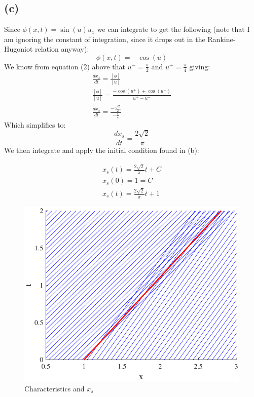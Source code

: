 \documentclass{article}
\begin{document}
\subsection*{(c)}
Since $\phi(x,t) = \sin(u)u_x$ we can integrate to get the following (note that I am ignoring the constant of integration, since it drops out in the Rankine-Hugoniot relation anyway):
\begin{equation}
\phi(x, t) = -\cos(u)
\end{equation}
We know from equation (2) above that $u^- = \frac{\pi}{2}$ and $u^+ = \frac{\pi}{4}$ giving:
\begin{equation}
\begin{aligned}
\frac{dx_s}{dt} = \frac{[\phi]}{[u]}\\
\frac{[\phi]}{[u]} = \frac{-\cos(u^+) + \cos(u^-)}{u^+ - u^-}\\
\frac{dx_s}{dt} = \frac{-\frac{\sqrt{2}}{2}}{-\frac{\pi}{4}}
\end{aligned}
\end{equation}
Which simplifies to:
\begin{equation}
\frac{dx_s}{dt} = \frac{2\sqrt{2}}{\pi}
\end{equation}
We then integrate and apply the initial condition found in (b):
\begin{tcolorbox}[minipage,colback=white,arc=0pt,outer arc=0pt]
\begin{equation}
\begin{aligned}
x_s(t) = \frac{2\sqrt{2}}{\pi}t + C\\
x_s(0) = 1 = C\\
x_s(t) = \frac{2\sqrt{2}}{\pi}t + 1
\end{aligned}
\end{equation}
\end{tcolorbox}
\begin{figure}[!htbp]
  \centering
    \includegraphics[width=\textwidth]{hw_14_plot1.pdf}
    \caption{Characteristics and $x_s$}
\end{figure}
\FloatBarrier
\end{document}
